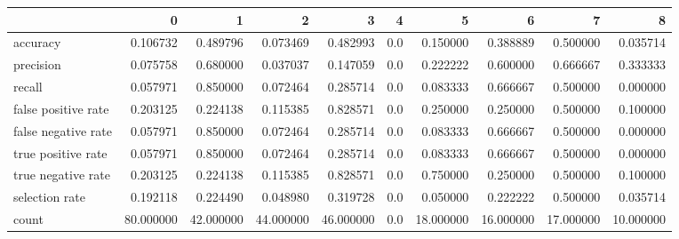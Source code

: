 \begin{tabular}{lrrrrrrrrr}
\toprule
{} &          0 &          1 &          2 &          3 &    4 &          5 &          6 &          7 &          8 \\
\midrule
accuracy            &   0.106732 &   0.489796 &   0.073469 &   0.482993 &  0.0 &   0.150000 &   0.388889 &   0.500000 &   0.035714 \\
precision           &   0.075758 &   0.680000 &   0.037037 &   0.147059 &  0.0 &   0.222222 &   0.600000 &   0.666667 &   0.333333 \\
recall              &   0.057971 &   0.850000 &   0.072464 &   0.285714 &  0.0 &   0.083333 &   0.666667 &   0.500000 &   0.000000 \\
false positive rate &   0.203125 &   0.224138 &   0.115385 &   0.828571 &  0.0 &   0.250000 &   0.250000 &   0.500000 &   0.100000 \\
false negative rate &   0.057971 &   0.850000 &   0.072464 &   0.285714 &  0.0 &   0.083333 &   0.666667 &   0.500000 &   0.000000 \\
true positive rate  &   0.057971 &   0.850000 &   0.072464 &   0.285714 &  0.0 &   0.083333 &   0.666667 &   0.500000 &   0.000000 \\
true negative rate  &   0.203125 &   0.224138 &   0.115385 &   0.828571 &  0.0 &   0.750000 &   0.250000 &   0.500000 &   0.100000 \\
selection rate      &   0.192118 &   0.224490 &   0.048980 &   0.319728 &  0.0 &   0.050000 &   0.222222 &   0.500000 &   0.035714 \\
count               &  80.000000 &  42.000000 &  44.000000 &  46.000000 &  0.0 &  18.000000 &  16.000000 &  17.000000 &  10.000000 \\
\bottomrule
\end{tabular}
